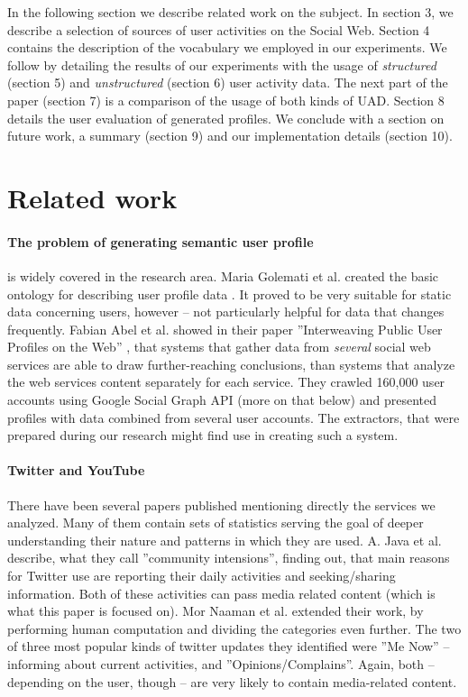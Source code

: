 In the following section we describe related work on the subject. In section 3, we describe
a selection of sources of user activities on the Social Web. Section 4 contains the description of
the vocabulary we employed in our experiments. We follow by detailing the results of our experiments
with the usage of \textit{structured} (section 5) and \textit{unstructured} (section 6) user activity data.
The next part of the paper (section 7) is a comparison of the usage of both kinds of UAD. Section 8
details the user evaluation of generated profiles. We conclude with a section on future
work, a summary (section 9) and our implementation details (section 10).

\section{Related work}

\paragraph{The problem of generating semantic user profile} is widely covered in the
research area. Maria Golemati et al. created the basic ontology for describing
user profile data \cite{creating-ontology-for-user-profile}. It proved to be
very suitable for static data concerning users, however -- not particularly
helpful for data that changes frequently. Fabian Abel et al. showed in their
paper ''Interweaving Public User Profiles on the Web'' \cite{public-profiles},
that systems that gather data from \textit{several} social web services are
able to draw further-reaching conclusions, than systems that analyze the web
services content separately for each service. They crawled 160,000 user
accounts using Google Social Graph API (more on that below) and presented
profiles with data combined from several user accounts.  The extractors, that
were prepared during our research might find use in creating such a system.

\paragraph{Twitter and YouTube} There have been several papers published
mentioning directly the services we analyzed. Many of them contain sets of
statistics serving the goal of deeper understanding their nature and patterns
in which they are used. A. Java et al. \cite{why-we-twitter} describe, what
they call ''community intensions'', finding out, that main reasons for Twitter
use are reporting their daily activities and seeking/sharing information. Both
of these activities can pass media related content (which is what this paper is
focused on). Mor Naaman et al. \cite{twitter-content-is-it} extended their
work, by performing human computation and dividing the categories even further.
The two of three most popular kinds of twitter updates they identified were
''Me Now'' -- informing about current activities, and ''Opinions/Complains''.
Again, both -- depending on the user, though -- are very likely to contain
media-related content.

